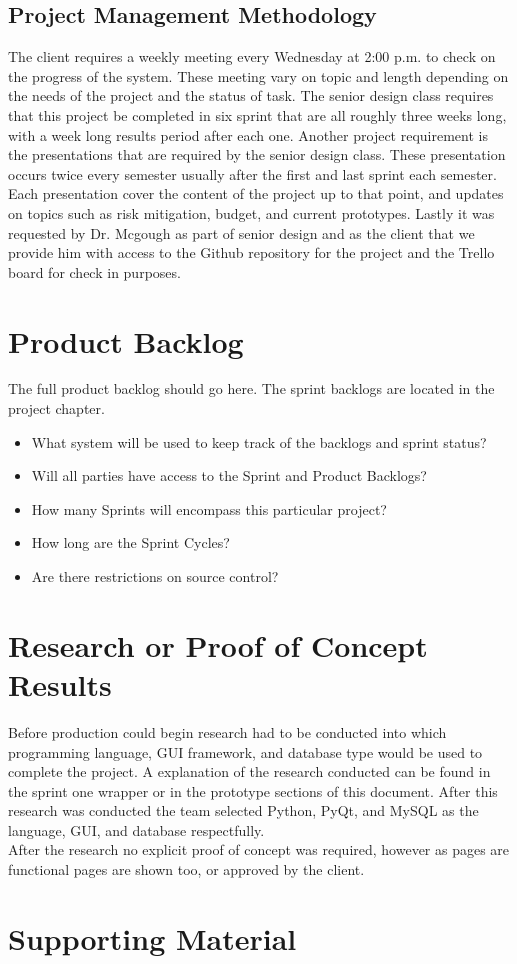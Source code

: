 \subsection{Project  Management Methodology}
The client requires a weekly meeting every Wednesday at 2:00 p.m. to check on the progress of the system. These meeting vary on topic and length depending on the needs of the project and the status of task. The senior design class requires that this project be completed in six sprint that are all roughly three weeks long, with a week long results period after each one. Another project requirement is the presentations that are required by the senior design class. These presentation occurs twice every semester usually after the first and last sprint each semester. Each presentation cover the content of the project up to that point, and updates on topics such as risk mitigation, budget, and current prototypes. Lastly it was requested by Dr. Mcgough as part of senior design and as the client that we provide him with access to the Github repository for the project and the Trello board for check in purposes.


\section{Product Backlog}
The full product backlog should go here.  The sprint backlogs are located in the project chapter.

 
\begin{itemize}
\item What system will be used to keep track of the backlogs and sprint status?
\item Will all parties have access to the Sprint and Product Backlogs?
\item How many Sprints will encompass this particular project?
\item How long are the Sprint Cycles?
\item Are there restrictions on source control? 
\end{itemize}


\section{Research or Proof of Concept Results}
Before production could begin research had to be conducted into which programming language, GUI framework, and database type would be used to complete the project. A explanation of the research conducted can be found in the sprint one wrapper or in the prototype sections of this document. After this research was conducted the team selected Python, PyQt, and MySQL as the language, GUI, and database respectfully.\\
After the research no explicit proof of concept was required, however as pages are functional pages are shown too, or approved by the client. 


\section{Supporting Material}


